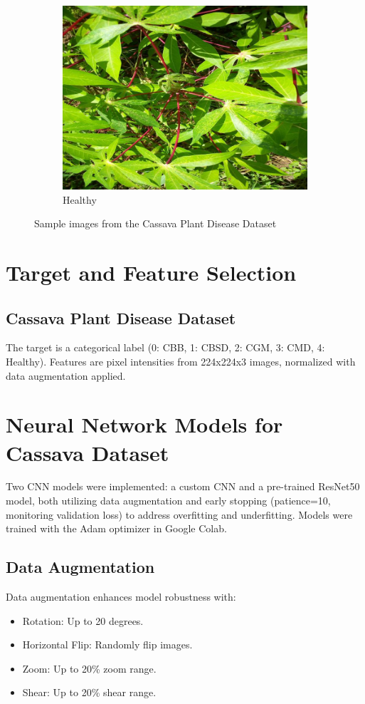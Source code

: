\documentclass[a4paper,12pt]{article}
\begin{document}
\begin{figure}[H]
    \begin{subfigure}{0.45\textwidth}
        \centering
        \includegraphics[width=\textwidth]{assets/class_images/class_4.jpg}
        \caption{Healthy}
    \end{subfigure}
    \caption{Sample images from the Cassava Plant Disease Dataset}
\end{figure}

\clearpage

\section*{Target and Feature Selection}
\subsection*{Cassava Plant Disease Dataset}
The target is a categorical label (0: CBB, 1: CBSD, 2: CGM, 3: CMD, 4: Healthy). Features are pixel intensities from 224x224x3 images, normalized with data augmentation applied.

\section*{Neural Network Models for Cassava Dataset}
Two CNN models were implemented: a custom CNN and a pre-trained ResNet50 model, both utilizing data augmentation and early stopping (patience=10, monitoring validation loss) to address overfitting and underfitting. Models were trained with the Adam optimizer in Google Colab.

\subsection*{Data Augmentation}
Data augmentation enhances model robustness with:
\begin{itemize}
    \item Rotation: Up to 20 degrees.
    \item Horizontal Flip: Randomly flip images.
    \item Zoom: Up to 20\% zoom range.
    \item Shear: Up to 20\% shear range.
\end{itemize}
\end{document}
